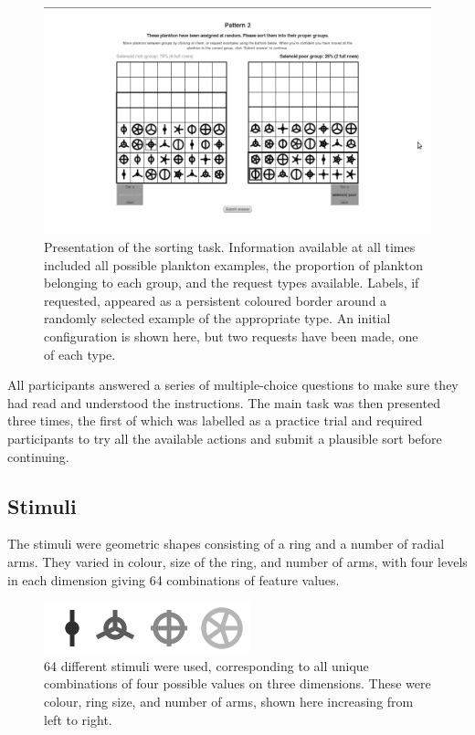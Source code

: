 \documentclass[10pt,letterpaper]{article}
\begin{document}
\begin{figure}[t] %
\includegraphics[width=\textwidth]{screenshot_bw.png}
\caption{Presentation of the sorting task. Information available at all times included all possible plankton examples, the proportion of plankton belonging to each group, and the request types available. Labels, if requested, appeared as a persistent coloured border around a randomly selected example of the appropriate type. An initial configuration is shown here, but two requests have been made, one of each type.}
\label{screenshot}
\end{figure}

All participants answered a series of multiple-choice questions to make sure they had read and understood the instructions. The main task was then presented three times, the first of which was labelled as a practice trial and required participants to try all the available actions and submit a plausible sort before continuing. 


\subsection{Stimuli}
The stimuli were geometric shapes consisting of a ring and a number of radial arms. They varied in colour, size of the ring, and number of arms, with four levels in each dimension giving 64 combinations of feature values.

\begin{figure}[t]
\centering
\includegraphics[width=.3\textwidth]{minstim_bw.png}
\caption{64 different stimuli were used, corresponding to all unique combinations of four possible values on three dimensions. These were colour, ring size, and number of arms, shown here increasing from left to right.}
\end{figure}
\end{document}
